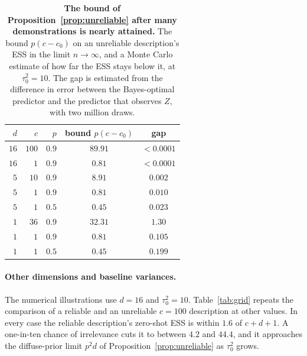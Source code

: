 \begin{table}[t]
\centering\small
\caption[The bound after many demonstrations is nearly attained]{\textbf{The bound of Proposition~\ref{prop:unreliable} after many demonstrations is nearly attained.} The bound $p(c-c_0)$ on an unreliable description's ESS in the limit $n\to\infty$, and a Monte Carlo estimate of how far the ESS stays below it, at $\tau_0^2=10$. The gap is estimated from the difference in error between the Bayes-optimal predictor and the predictor that observes $Z$, with two million draws.}
\label{tab:gap}
\vspace{3pt}
\begin{tabular}{rrrcc}
\toprule
$d$ & $c$ & $p$ & bound $p(c-c_0)$ & gap \\
\midrule
$16$ & $100$ & $0.9$ & $89.91$ & $<0.0001$ \\
$16$ & $1$ & $0.9$ & $0.81$ & $<0.0001$ \\
$5$ & $10$ & $0.9$ & $8.91$ & $0.002$ \\
$5$ & $1$ & $0.9$ & $0.81$ & $0.010$ \\
$5$ & $1$ & $0.5$ & $0.45$ & $0.023$ \\
$1$ & $36$ & $0.9$ & $32.31$ & $1.30$ \\
$1$ & $1$ & $0.9$ & $0.81$ & $0.105$ \\
$1$ & $1$ & $0.5$ & $0.45$ & $0.199$ \\
\bottomrule
\end{tabular}
\end{table}

\paragraph{Other dimensions and baseline variances.}
The numerical illustrations use $d=16$ and $\tau_0^2=10$. Table~\ref{tab:grid} repeats the comparison of a reliable and an unreliable $c=100$ description at other values. In every case the reliable description's zero-shot ESS is within $1.6$ of $c+d+1$. A one-in-ten chance of irrelevance cuts it to between $4.2$ and $44.4$, and it approaches the diffuse-prior limit $p^2d$ of Proposition~\ref{prop:unreliable} as $\tau_0^2$ grows.

